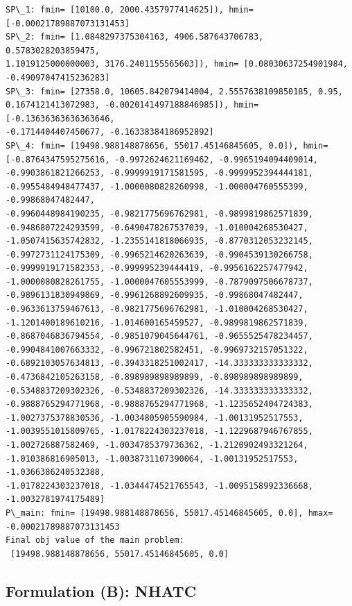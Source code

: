 \documentclass[11pt]{article}
\begin{document}
    \begin{Verbatim}[commandchars=\\\{\}]
SP\_1: fmin= [10100.0, 2000.4357977414625]), hmin= [-0.00021789887073131453]
SP\_2: fmin= [1.0848297375304163, 4906.587643706783, 0.5783028203859475,
1.1019125000000003, 3176.2401155565603]), hmin= [0.08030637254901984,
-0.49097047415236283]
SP\_3: fmin= [27358.0, 10605.842079414004, 2.5557638109850185, 0.95,
0.1674121413072983, -0.0020141497188846985]), hmin= [-0.13636363636363646,
-0.1714404407450677, -0.16338384186952892]
SP\_4: fmin= [19498.988148878656, 55017.45146845605, 0.0]), hmin=
[-0.8764347595275616, -0.9972624621169462, -0.9965194094409014,
-0.9903861821266253, -0.9999919171581595, -0.9999952394444181,
-0.9955484948477437, -1.0000080828260998, -1.000004760555399, -0.99868047482447,
-0.9960448984190235, -0.9821775696762981, -0.9899819862571839,
-0.9486807224293599, -0.6490478267537039, -1.010004268530427,
-1.0507415635742832, -1.2355141818066935, -0.8770312053232145,
-0.9972731124175309, -0.9965214620263639, -0.9904539130266758,
-0.9999919171582353, -0.999995239444419, -0.9956162257477942,
-1.0000080828261755, -1.0000047605553999, -0.7879097506678737,
-0.9896131830949869, -0.9961268892609935, -0.99868047482447,
-0.9633613759467613, -0.9821775696762981, -1.010004268530427,
-1.1201400189610216, -1.014600165459527, -0.9899819862571839,
-0.8687046836794554, -0.9851079045644761, -0.9655525478234457,
-0.9904841007663332, -0.996721802582451, -0.9969732157051322,
-0.6892103057634813, -0.3943318251002417, -14.333333333333332,
-0.4736842105263158, -0.898989898989899, -0.898989898989899,
-0.5348837209302326, -0.5348837209302326, -14.333333333333332,
-0.9888765294771968, -0.9888765294771968, -1.1235652404724383,
-1.0027375378830536, -1.0034805905590984, -1.00131952517553,
-1.0039551015809765, -1.0178224303237018, -1.1229687946767855,
-1.002726887582469, -1.0034785379736362, -1.2120902493321264,
-1.010386816905013, -1.0038731107390064, -1.00131952517553, -1.0366386240532388,
-1.0178224303237018, -1.0344474521765543, -1.0095158992336668,
-1.0032781974175489]
P\_main: fmin= [19498.988148878656, 55017.45146845605, 0.0], hmax=
-0.00021789887073131453
Final obj value of the main problem:
 [19498.988148878656, 55017.45146845605, 0.0]
    \end{Verbatim}

    \hypertarget{formulation-b-nhatc}{%
\subsection{Formulation (B): NHATC}\label{formulation-b-nhatc}}
\end{document}
